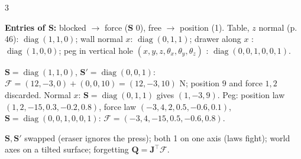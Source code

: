 \begin{multicols}{3}
\begin{wnfig}
{}\par
{}
\end{wnfig}
\textbf{Entries of $\mathbf S$:} blocked $\to$ force ($\mathbf S$ 0), free $\to$ position (1). Table, $z$ normal (p.\,46): $\operatorname{diag}(1,1,0)$; wall normal $x$: $\operatorname{diag}(0,1,1)$; drawer along $x$ \added: $\operatorname{diag}(1,0,0)$; peg in vertical hole $(x,y,z,\theta_x,\theta_y,\theta_z)$ \added: $\operatorname{diag}(0,0,1,0,0,1)$.
\begin{worked}[wipe a table, $z$ normal; $\mathcal F_{pos}=(12,-3,9)$, $\mathcal F_{force}=(1,2,10)$ N]
$\mathbf S=\operatorname{diag}(1,1,0)$, $\mathbf S'=\operatorname{diag}(0,0,1)$: $\mathcal F=(12,-3,0)+(0,0,10)=(12,-3,10)$ N; position $9$ and force $1,2$ discarded. Normal $x$: $\mathbf S=\operatorname{diag}(0,1,1)$ gives $(1,-3,9)$. Peg: position law $(1,2,-15,0.3,-0.2,0.8)$, force law $(-3,4,2,0.5,-0.6,0.1)$, $\mathbf S=\operatorname{diag}(0,0,1,0,0,1)$: $\mathcal F=(-3,4,-15,0.5,-0.6,0.8)$. \chk
\end{worked}
\begin{trap}
$\mathbf S,\mathbf S'$ swapped (eraser ignores the press); both 1 on one axis (laws fight); world axes on a tilted surface; forgetting $\mathbf Q=\mathbf J^\top\mathcal F$.
\end{trap}


\end{multicols}
